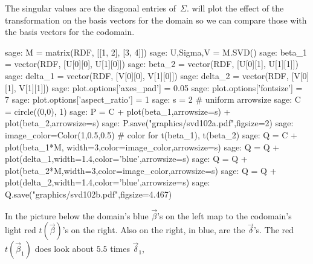 The singular values are the diagonal entries of~$\Sigma$.
\Sage{} will plot the effect of the transformation
on the basis vectors for the domain so we can compare those with the
basis vectors for the codomain.
\begin{sagecommandline}
sage: M = matrix(RDF, [[1, 2], [3, 4]])
sage: U,Sigma,V = M.SVD()
sage: beta_1 = vector(RDF, [U[0][0], U[1][0]])
sage: beta_2 = vector(RDF, [U[0][1], U[1][1]])
sage: delta_1 = vector(RDF, [V[0][0], V[1][0]])
sage: delta_2 = vector(RDF, [V[0][1], V[1][1]])
sage: plot.options['axes_pad'] = 0.05
sage: plot.options['fontsize'] = 7
sage: plot.options['aspect_ratio'] = 1
sage: s = 2  # uniform arrowsize
sage: C = circle((0,0), 1)
sage: P = C + plot(beta_1,arrowsize=s) + plot(beta_2,arrowsize=s)
sage: P.save("graphics/svd102a.pdf",figsize=2)
sage: image_color=Color(1,0.5,0.5)   # color for t(beta_1), t(beta_2)
sage: Q = C + plot(beta_1*M, width=3,color=image_color,arrowsize=s) 
sage: Q = Q + plot(delta_1,width=1.4,color='blue',arrowsize=s) 
sage: Q = Q + plot(beta_2*M,width=3,color=image_color,arrowsize=s) 
sage: Q = Q + plot(delta_2,width=1.4,color='blue',arrowsize=s)
sage: Q.save("graphics/svd102b.pdf",figsize=4.467)
\end{sagecommandline}
In the picture below the domain's 
blue $\vec{\beta}$'s on the left map to the codomain's light red 
$t(\vec{\beta})$'s on the right.
Also on the right, in blue, are the $\vec{\delta}$'s.
The red $t(\vec{\beta}_1)$ does look about $5.5$ times $\vec{\delta}_1$,
